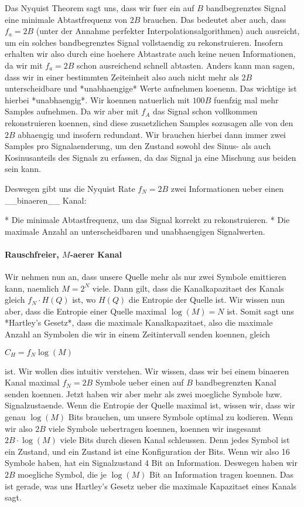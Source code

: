 Das Nyquist Theorem sagt uns, dass wir fuer ein auf $B$ bandbegrenztes Signal
eine minimale Abtastfrequenz von $2B$ brauchen. Das bedeutet aber auch, dass
$f_a = 2B$ (unter der Annahme perfekter Interpolationsalgorithmen) auch
ausreicht, um ein solches bandbegrenztes Signal vollstaendig zu
rekonstruieren. Insofern erhalten wir also durch eine hoehere Abtastrate auch
keine neuen Informationen, da wir mit $f_a = 2B$ schon ausreichend schnell
abtasten. Anders kann man sagen, dass wir in einer bestimmten Zeiteinheit also
auch nicht mehr als $2B$ unterscheidbare und *unabhaengige* Werte aufnehmen
koenenn. Das wichtige ist hierbei *unabhaengig*. Wir koennen natuerlich mit
$100B$ fuenfzig mal mehr Samples aufnehmen. Da wir aber mit $f_A$ das Signal
schon vollkommen rekonstruieren koennen, sind diese zusaetzlichen Samples
sozusagen alle von den $2B$ abhaengig und insofern redundant. Wir brauchen
hierbei dann immer zwei Samples pro Signalaenderung, um den Zustand sowohl des
Sinus- als auch Kosinusanteils des Signals zu erfassen, da das Signal ja eine
Mischung aus beiden sein kann.

Deswegen gibt uns die Nyquist Rate $f_N = 2B$ zwei Informationen ueber einen
\_\_binaeren\_\_ Kanal:

* Die minimale Abtastfrequenz, um das Signal korrekt zu rekonstruieren.
* Die maximale Anzahl an unterscheidbaren und unabhaengigen Signalwerten.

\paragraph{ Rauschfreier, $M$-aerer Kanal}

Wir nehmen nun an, dass unsere Quelle mehr als nur zwei Symbole emittieren kann,
naemlich $M = 2^N$ viele. Dann gilt, dass die Kanalkapazitaet des Kanals gleich
$f_N \cdot H(Q)$ ist, wo $H(Q)$ die Entropie der Quelle ist. Wir wissen nun
aber, dass die Entropie einer Quelle maximal $\log(M) = N$ ist. Somit sagt uns
*Hartley's Gesetz*, dass die maximale Kanalkapazitaet, also die maximale Anzahl
an Symbolen die wir in einem Zeitintervall senden koennen, gleich

$C_H = f_N\log(M)$

ist. Wir wollen dies intuitiv verstehen. Wir wissen, dass wir bei einem binaeren
Kanal maximal $f_N = 2B$ Symbole ueber einen auf $B$ bandbegrenzten Kanal senden
koennen. Jetzt haben wir aber mehr als zwei moegliche Symbole
bzw. Signalzustaende. Wenn die Entropie der Quelle maximal ist, wissen wir, dass
wir genau $\log(M)$ Bits brauchen, um unsere Symbole optimal zu kodieren. Wenn
wir also $2B$ viele Symbole uebertragen koennen, koennen wir insgesamt $2B \cdot
\log(M)$ viele Bits durch diesen Kanal schleussen. Denn jedes Symbol ist ein
Zustand, und ein Zustand ist eine Konfiguration der Bits. Wenn wir also 16
Symbole haben, hat ein Signalzustand 4 Bit an Information. Deswegen haben wir
$2B$ moegliche Symbol, die je $\log(M)$ Bit an Information tragen koennen. Das
ist gerade, was uns Hartley's Gesetz ueber die maximale Kapazitaet eines Kanals
sagt.

